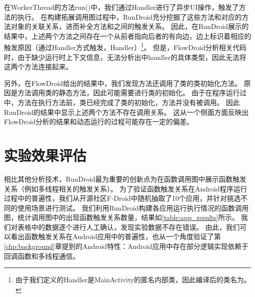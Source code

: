 
在WorkerThread的方法run()中，我们通过Handler进行了异步UI操作，触发了方法的执行。
在构建拓展调用图过程中，RunDroid充分挖掘了这些方法和对应的方法对象的关联关系，进而补全方法和之间的触发关系。
因此，在RunDroid展示的结果中，上述两个方法之间存在一个从前者指向后者的有向边，边上标识着相应的触发原因（通过Handler方式触发，Handler）\footnote{由于我们定义的Handler是MainActivity的匿名内部类，因此编译后的类名为。}。
但是，FlowDroid分析相关代码时，由于缺少运行时上下文信息，无法分析出中handler的具体类型，因此无法将这两个方法连接起来。






另外，在FlowDroid给出的结果中，我们发现方法还调用了类的类初始化方法。
原因是方法调用类的静态方法，因此可能需要进行类的初始化。
由于在程序运行过中，方法在执行方法前，类已经完成了类的初始化，方法并没有被调用。
因此RunDroid的结果中显示上述两个方法不存在调用关系。
这从一个侧面方面反映出FlowDroid分析的结果和动态运行的过程可能存在一定的偏差。





\section{实验效果评估}

相比其他分析技术，RunDroid最为重要的创新点为在函数调用图中展示函数触发关系（例如多线程相关的触发关系）。
为了验证函数触发关系在Android程序运行过程中的普遍性，我们从开源社区F-Droid\cite{FDroidFr21:online}中随机抽取了10个应用，并针对挑选不同的使用场景进行测试。
我们利用RunDroid构建各应用运行执行情况的函数调用图，统计调用图中的出现函数触发关系数量，结果如\autoref{table:app_results}所示。
我们对表格中的数据逐个进行人工确认，发现实验数据不存在错误。
由此，我们可以看出函数触发关系在Android应用中的普遍性，也从一个角度验证了第\ref{chp:background}章提到的Android特性：Android应用中存在部分逻辑实现依赖于回调函数和多线程通信。

